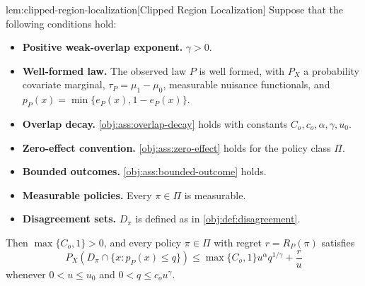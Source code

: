 \documentclass[11pt]{article}
\begin{document}
\begin{lemmav}{lem:clipped-region-localization}[Clipped Region Localization]
Suppose that the following conditions hold:
\begin{itemize}
\item \textbf{Positive weak-overlap exponent.} \(\gamma>0\).
\item \textbf{Well-formed law.} The observed law \(P\) is well formed, with \(P_X\) a probability covariate marginal, \(\tau_P=\mu_1-\mu_0\), measurable nuisance functionals, and \(p_P(x)=\min\{e_P(x),1-e_P(x)\}\).
\item \textbf{Overlap decay.} \cref{obj:ass:overlap-decay} holds with constants \(C_o,c_o,\alpha,\gamma,u_0\).
\item \textbf{Zero-effect convention.} \cref{obj:ass:zero-effect} holds for the policy class \(\Pi\).
\item \textbf{Bounded outcomes.} \cref{obj:ass:bounded-outcome} holds.
\item \textbf{Measurable policies.} Every \(\pi\in\Pi\) is measurable.
\item \textbf{Disagreement sets.} \(D_\pi\) is defined as in \cref{obj:def:disagreement}.
\end{itemize}
Then \(\max\{C_o,1\}>0\), and every policy \(\pi\in\Pi\) with regret \(r=R_P(\pi)\) satisfies
\[
P_X\!\left(D_\pi\cap\{x:p_P(x)\le q\}\right)
\le
\max\{C_o,1\} u^\alpha q^{1/\gamma}+\frac{r}{u}
\]
whenever \(0<u\le u_0\) and \(0<q\le c_o u^\gamma\).
\end{lemmav}
\end{document}
